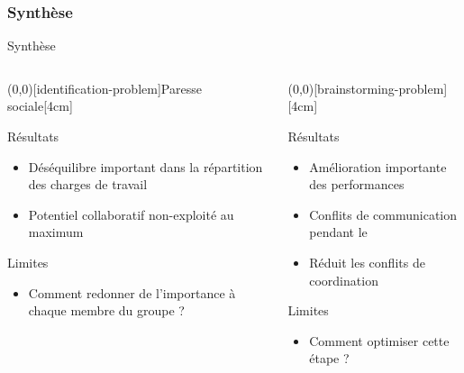 \documentclass[english,french,dvips,10pt]{mybeamer}
\begin{document}
	\subsubsection{Synthèse}
	\begin{myframe}{Synthèse}
		\begin{columns}[t]
			\begin{column}{0.475\textwidth}
				\centering
				\myunode[90][shadowcolor=myblue](0,0)[identification-problem]{Paresse sociale}[4cm]
				\begin{myplusblock}{Résultats }
					\begin{itemize}
						\item Déséquilibre important dans la répartition des charges de travail
						\item Potentiel collaboratif non-exploité au maximum
					\end{itemize}
				\end{myplusblock}
				\begin{myminusblock}{Limites}
					\begin{itemize}
						\item Comment redonner de l'importance à chaque membre du groupe ?
					\end{itemize}
				\end{myminusblock}
			\end{column}
			\begin{column}{0.475\textwidth}
				\centering
				\myunode[90][shadowcolor=myblue](0,0)[brainstorming-problem]{\myBrainstorming}[4cm]
				\begin{myplusblock}{Résultats }
					\begin{itemize}
						\item Amélioration importante des performances
						\item Conflits de communication pendant le \mybrainstorming
						\item Réduit les conflits de coordination
					\end{itemize}
				\end{myplusblock}
				\begin{myminusblock}{Limites}
					\begin{itemize}
						\item Comment optimiser cette étape ?
					\end{itemize}
				\end{myminusblock}
			\end{column}
		\end{columns}
	\end{myframe}
\end{document}
